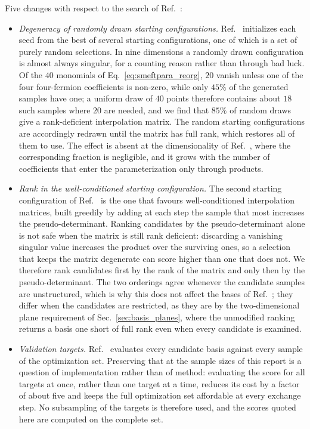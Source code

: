 Five changes with respect to the search of Ref.~\cite{HH_nonggf_R5}:

\begin{itemize}
  \item \emph{Degeneracy of randomly drawn starting configurations.} Ref.~\cite{HH_nonggf_R5} initializes each seed from the best of several starting configurations, one of which is a set of purely random selections. In nine dimensions a randomly drawn configuration is almost always singular, for a counting reason rather than through bad luck. Of the $40$ monomials of Eq.~\eqref{eq:smeftpara_reorg}, $20$ vanish unless one of the four four-fermion coefficients is non-zero, while only $45\%$ of the generated samples have one; a uniform draw of $40$ points therefore contains about $18$ such samples where $20$ are needed, and we find that $85\%$ of random draws give a rank-deficient interpolation matrix. The random starting configurations are accordingly redrawn until the matrix has full rank, which restores all of them to use. The effect is absent at the dimensionality of Ref.~\cite{HH_nonggf_R5}, where the corresponding fraction is negligible, and it grows with the number of coefficients that enter the parameterization only through products.
  \item \emph{Rank in the well-conditioned starting configuration.} The second starting configuration of Ref.~\cite{HH_nonggf_R5} is the one that favours well-conditioned interpolation matrices, built greedily by adding at each step the sample that most increases the pseudo-determinant. Ranking candidates by the pseudo-determinant alone is not safe when the matrix is still rank deficient: discarding a vanishing singular value increases the product over the surviving ones, so a selection that keeps the matrix degenerate can score higher than one that does not. We therefore rank candidates first by the rank of the matrix and only then by the pseudo-determinant. The two orderings agree whenever the candidate samples are unstructured, which is why this does not affect the bases of Ref.~\cite{HH_nonggf_R5}; they differ when the candidates are restricted, as they are by the two-dimensional plane requirement of Sec.~\ref{sec:basis_planes}, where the unmodified ranking returns a basis one short of full rank even when every candidate is examined.
  \item \emph{Validation targets.} Ref.~\cite{HH_nonggf_R5} evaluates every candidate basis against every sample of the optimization set. Preserving that at the sample sizes of this report is a question of implementation rather than of method: evaluating the score for all targets at once, rather than one target at a time, reduces its cost by a factor of about five and keeps the full optimization set affordable at every exchange step. No subsampling of the targets is therefore used, and the scores quoted here are computed on the complete set.

\end{itemize}
